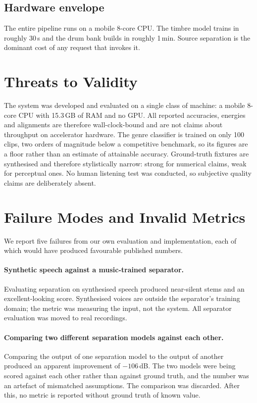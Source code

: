 \documentclass[conference]{IEEEtran}
\begin{document}
\subsection{Hardware envelope}

The entire pipeline runs on a mobile 8-core CPU. The timbre model trains in
roughly 30\,s and the drum bank builds in roughly 1\,min. Source separation is
the dominant cost of any request that invokes it.

\section{Threats to Validity}

The system was developed and evaluated on a single class of machine: a mobile
8-core CPU with 15.3\,GB of RAM and no GPU. All reported accuracies, energies
and alignments are therefore wall-clock-bound and are not claims about
throughput on accelerator hardware. The genre classifier is trained on only 100
clips, two orders of magnitude below a competitive benchmark, so its figures are
a floor rather than an estimate of attainable accuracy. Ground-truth fixtures
are synthesised and therefore stylistically narrow: strong for numerical claims,
weak for perceptual ones. No human listening test was conducted, so subjective
quality claims are deliberately absent.

\section{Failure Modes and Invalid Metrics}

We report five failures from our own evaluation and implementation, each of
which would have produced favourable published numbers.

\paragraph{Synthetic speech against a music-trained separator.}
Evaluating separation on synthesised speech produced near-silent stems and an
excellent-looking score. Synthesised voices are outside the separator's training
domain; the metric was measuring the input, not the system. All separator
evaluation was moved to real recordings.

\paragraph{Comparing two different separation models against each other.}
Comparing the output of one separation model to the output of another produced
an apparent improvement of $-106$\,dB. The two models were being scored against
each other rather than against ground truth, and the number was an artefact of
mismatched assumptions. The comparison was discarded. After this, no metric is
reported without ground truth of known value.
\end{document}
